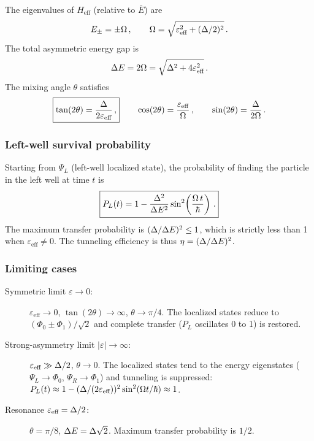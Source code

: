 The eigenvalues of $H_{\text{eff}}$ (relative to $\bar{E}$) are
\begin{equation}
  E_\pm = \pm\Omega\,,\qquad
  \Omega = \sqrt{\varepsilon_{\text{eff}}^2 + (\Delta/2)^2}\,.
\end{equation}
The total asymmetric energy gap is
\begin{equation}\label{eq:gap_asym}
  \Delta E = 2\Omega = \sqrt{\Delta^2 + 4\varepsilon_{\text{eff}}^2}\,.
\end{equation}
The mixing angle $\theta$ satisfies
\begin{equation}\label{eq:mixing_angle}
  \boxed{\tan(2\theta) = \frac{\Delta}{2\varepsilon_{\text{eff}}}\,,}
  \qquad
  \cos(2\theta) = \frac{\varepsilon_{\text{eff}}}{\Omega}\,,
  \qquad
  \sin(2\theta) = \frac{\Delta}{2\Omega}\,.
\end{equation}

\subsubsection{Left-well survival probability}

Starting from $\Psi_L$ (left-well localized state), the probability of finding
the particle in the left well at time $t$ is
\begin{equation}\label{eq:P_L_asym}
  \boxed{P_L(t) = 1 - \frac{\Delta^2}{\Delta E^2}\sin^2\!\left(\frac{\Omega\,t}{\hbar}\right)\,.}
\end{equation}
The maximum transfer probability is $(\Delta/\Delta E)^2 \leq 1$, which is
strictly less than 1 when $\varepsilon_{\text{eff}} \neq 0$. The tunneling
efficiency is thus $\eta = (\Delta/\Delta E)^2$.

\subsubsection{Limiting cases}

\begin{description}
  \item[Symmetric limit $\varepsilon \to 0$:] $\varepsilon_{\text{eff}} \to 0$,
    $\tan(2\theta)\to\infty$, $\theta\to\pi/4$.  The localized states reduce to
    $(\Phi_0\pm\Phi_1)/\sqrt{2}$ and complete transfer ($P_L$ oscillates 0 to 1) is restored.
  \item[Strong-asymmetry limit $|\varepsilon|\to\infty$:] $\varepsilon_{\text{eff}}\gg\Delta/2$,
    $\theta\to 0$. The localized states tend to the energy eigenstates
    ($\Psi_L\to\Phi_0$, $\Psi_R\to\Phi_1$) and tunneling is suppressed:
    $P_L(t)\approx 1-(\Delta/(2\varepsilon_{\text{eff}}))^2\sin^2(\Omega t/\hbar)\approx 1$.
  \item[Resonance $\varepsilon_{\text{eff}} = \Delta/2$:] $\theta=\pi/8$,
    $\Delta E=\Delta\sqrt{2}$. Maximum transfer probability is $1/2$.
\end{description}

